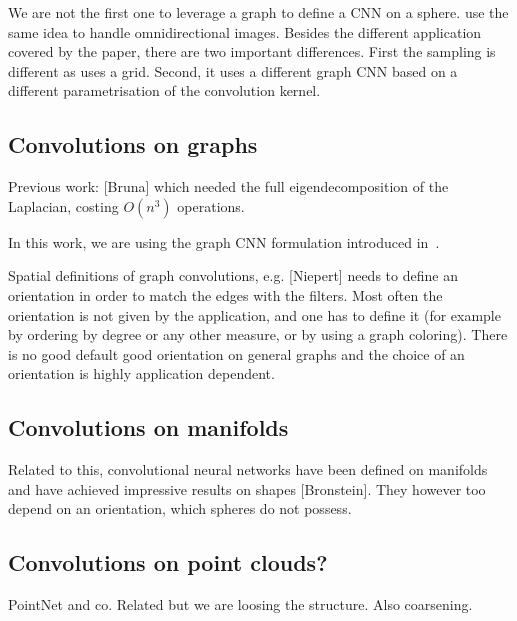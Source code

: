 \documentclass[final,twocolumn,3p,times,authoryear]{elsarticle}
\newcommand{\todo}[1]{{\color[rgb]{.6,.1,.6}{#1}}}
\newcommand{\assign}[1]{{\color[rgb]{.8,.5,.8}{Assigned: #1 }}}
\newcommand{\1}{\b{1}}              %
\newcommand{\0}{\b{0}}              %
\begin{document}
We are not the first one to leverage a graph to define a CNN on a sphere.
\cite{khasanova2017graph} use the same idea to handle omnidirectional images.
Besides the different application covered by the paper, there are two important
differences. First the sampling is different as \cite{khasanova2017graph} uses a
grid. Second, it uses a different graph CNN based on a different parametrisation
of the convolution kernel.


\subsection{Convolutions on graphs}
\assign{Michaël}

\todo{other approaches? GNNs, Kipf first order approx, message passing}

Previous work: [Bruna] which needed the full eigendecomposition of the Laplacian, costing $O(n^3)$ operations.

In this work, we are using the graph CNN formulation introduced in~\cite{defferrard2016convolutional}.

Spatial definitions of graph convolutions, e.g. [Niepert] needs to define an orientation in order to match the edges with the filters. Most often the orientation is not given by the application, and one has to define it (for example by ordering by degree or any other measure, or by using a graph coloring). There is no good default good orientation on general graphs and the choice of an orientation is highly application dependent.

\todo{Cool to have a global illustration of the network (CNN like)}

\subsection{Convolutions on manifolds}

Related to this, convolutional neural networks have been defined on manifolds and have achieved impressive results on shapes [Bronstein]. They however too depend on an orientation, which spheres do not possess.

\subsection{Convolutions on point clouds?}

PointNet and co. Related but we are loosing the structure. Also coarsening.
\end{document}
